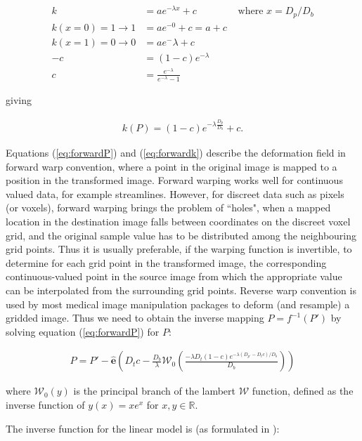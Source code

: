 \begin{align*}
  k &= a e^{-\lambda x} + c &\text{ where } x = D_p / D_b \\
  k(x=0)=1 \longrightarrow 1 &= a e^{-0} + c = a + c \\
  k(x=1)=0 \longrightarrow 0 &= a e{^-\lambda} + c \\
  -c &= (1-c) e^{-\lambda} \\
  c &= \frac{e^{-\lambda}}{e^{-\lambda} - 1}
\end{align*}

giving

\begin{align}\label{eq:forwardk}
  k(P) = (1-c)e^{-\lambda \frac{D_p}{D_b}} +c.
\end{align}

Equations (\ref{eq:forwardP}) and (\ref{eq:forwardk}) describe the deformation field in forward warp convention, where a point in the original image is mapped to a position in the transformed image.
Forward warping works well for continuous valued data, for example streamlines.
However, for discreet data such as pixels (or voxels), forward warping brings the problem of ``holes", when a mapped location in the destination image falls between coordinates on the discreet voxel grid, and the original sample value has to be distributed among the neighbouring grid points.
Thus it is usually preferable, if the warping function is invertible, to determine for each grid point in the transformed image, the corresponding continuous-valued point in the source image from which the appropriate value can be interpolated from the surrounding grid points. 
Reverse warp convention is used by most  medical image manipulation packages to deform (and resample) a gridded image.
Thus we need to obtain the inverse mapping $P = f^{-1}(P')$ by solving equation (\ref{eq:forwardP}) for $P$:

\begin{align}
  P = P' - \mathbf{\hat{e}}(D_t c - \frac{D_b}{\lambda}\mathcal{W}_0(\frac{-\lambda D_t (1-c) e^{-\lambda(D_{p'}-D_tc)/D_b}}{D_b}))
\end{align}

where $\mathcal{W}_0(y)$ is the principal branch of the lambert $\mathcal{W}$ function, defined as the inverse function of $ y(x) = xe^x $ for $x,y \in \mathbb{R}$. 

The inverse function for the linear model is (as formulated in \textcite{Nowinski2005}):

